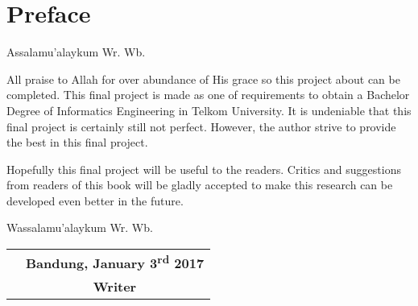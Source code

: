 \chapter*{Preface}

Assalamu'alaykum Wr. Wb.

\vspace{1cm}

All praise to Allah for over abundance of His grace so this project about \Title can be completed. This final project is made as one of requirements to obtain a Bachelor Degree of Informatics Engineering in Telkom University. 
It is undeniable that this final project is certainly still not perfect. However, the author strive to provide the best in this final project.

Hopefully this final project will be useful to the readers. Critics and suggestions from readers of this book will be gladly accepted to make this research can be developed even better in the future.

\vspace{1cm}
Wassalamu'alaykum Wr. Wb.

\vspace{1cm}
\begin{center}
\begin{tabular} {m{7cm} c}
	 & \textbf{Bandung, January 3\textsuperscript{rd} 2017} \\
	 & \textbf{Writer}
\end{tabular}
\end{center}